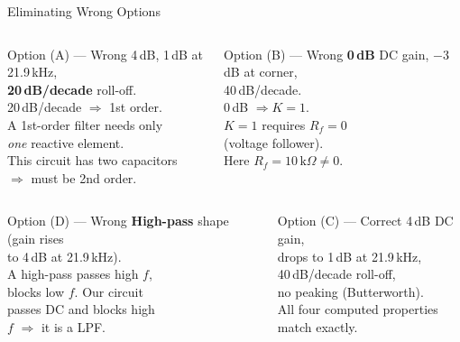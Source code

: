\documentclass{beamer}
\begin{document}
\begin{frame}{Eliminating Wrong Options}
  \begin{columns}
    \begin{alertblock}{Option (A) --- Wrong}
      4\,dB, 1\,dB at 21.9\,kHz,\\
      \textbf{20\,dB/decade} roll-off.\\[0.3em]
      20\,dB/decade $\Rightarrow$ 1st order.\\
      A 1st-order filter needs only\\
      \textit{one} reactive element.\\
      This circuit has two capacitors\\
      $\Rightarrow$ must be 2nd order. \texttimes
    \end{alertblock}
    \begin{alertblock}{Option (B) --- Wrong}
      \textbf{0\,dB} DC gain, $-3$\,dB at corner,\\
      40\,dB/decade.\\[0.3em]
      0\,dB $\Rightarrow K=1$.\\
      $K=1$ requires $R_f=0$\\
      (voltage follower).\\
      Here $R_f = 10\,\text{k}\Omega \ne 0$. \texttimes
    \end{alertblock}
  \end{columns}
  \vspace{0.6em}
  \begin{columns}
    \begin{alertblock}{Option (D) --- Wrong}
      \textbf{High-pass} shape (gain rises\\
      to 4\,dB at 21.9\,kHz).\\[0.3em]
      A high-pass passes high $f$,\\
      blocks low $f$. Our circuit\\
      passes DC and blocks high\\
      $f$ $\Rightarrow$ it is a LPF. \texttimes
    \end{alertblock}
    \begin{exampleblock}{Option (C) --- Correct \checkmark}
      4\,dB DC gain,\\
      drops to 1\,dB at 21.9\,kHz,\\
      40\,dB/decade roll-off,\\
      no peaking (Butterworth).\\[0.3em]
      All four computed properties\\
      match exactly. \checkmark
    \end{exampleblock}
  \end{columns}
\end{frame}
\end{document}
